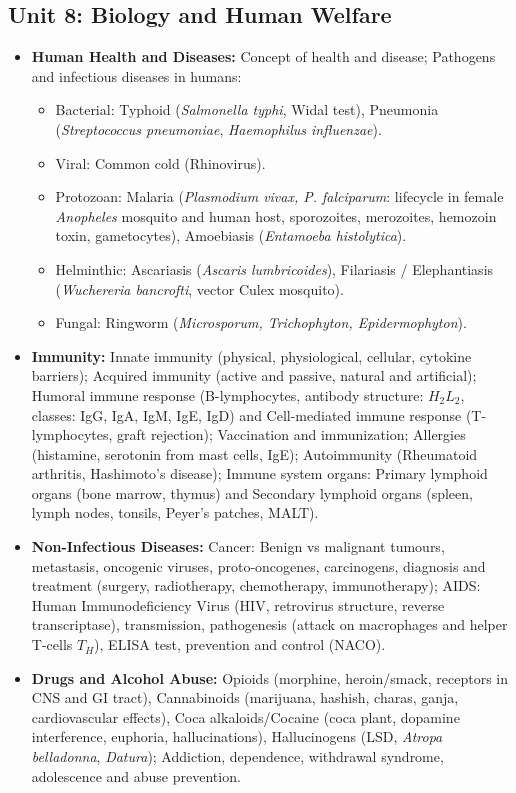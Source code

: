 \documentclass[11pt,a4paper]{article}
\begin{document}
\subsection{Unit 8: Biology and Human Welfare}
\begin{itemize}
  \item \textbf{Human Health and Diseases:} Concept of health and disease; Pathogens and infectious diseases in humans:
  \begin{itemize}
    \item Bacterial: Typhoid (\textit{Salmonella typhi}, Widal test), Pneumonia (\textit{Streptococcus pneumoniae}, \textit{Haemophilus influenzae}).
    \item Viral: Common cold (Rhinovirus).
    \item Protozoan: Malaria (\textit{Plasmodium vivax, P. falciparum}: lifecycle in female \textit{Anopheles} mosquito and human host, sporozoites, merozoites, hemozoin toxin, gametocytes), Amoebiasis (\textit{Entamoeba histolytica}).
    \item Helminthic: Ascariasis (\textit{Ascaris lumbricoides}), Filariasis / Elephantiasis (\textit{Wuchereria bancrofti}, vector Culex mosquito).
    \item Fungal: Ringworm (\textit{Microsporum, Trichophyton, Epidermophyton}).
  \end{itemize}
  \item \textbf{Immunity:} Innate immunity (physical, physiological, cellular, cytokine barriers); Acquired immunity (active and passive, natural and artificial); Humoral immune response (B-lymphocytes, antibody structure: $H_2 L_2$, classes: IgG, IgA, IgM, IgE, IgD) and Cell-mediated immune response (T-lymphocytes, graft rejection); Vaccination and immunization; Allergies (histamine, serotonin from mast cells, IgE); Autoimmunity (Rheumatoid arthritis, Hashimoto's disease); Immune system organs: Primary lymphoid organs (bone marrow, thymus) and Secondary lymphoid organs (spleen, lymph nodes, tonsils, Peyer's patches, MALT).
  \item \textbf{Non-Infectious Diseases:} Cancer: Benign vs malignant tumours, metastasis, oncogenic viruses, proto-oncogenes, carcinogens, diagnosis and treatment (surgery, radiotherapy, chemotherapy, immunotherapy); AIDS: Human Immunodeficiency Virus (HIV, retrovirus structure, reverse transcriptase), transmission, pathogenesis (attack on macrophages and helper T-cells $T_H$), ELISA test, prevention and control (NACO).
  \item \textbf{Drugs and Alcohol Abuse:} Opioids (morphine, heroin/smack, receptors in CNS and GI tract), Cannabinoids (marijuana, hashish, charas, ganja, cardiovascular effects), Coca alkaloids/Cocaine (coca plant, dopamine interference, euphoria, hallucinations), Hallucinogens (LSD, \textit{Atropa belladonna}, \textit{Datura}); Addiction, dependence, withdrawal syndrome, adolescence and abuse prevention.

\end{itemize}
\end{document}
